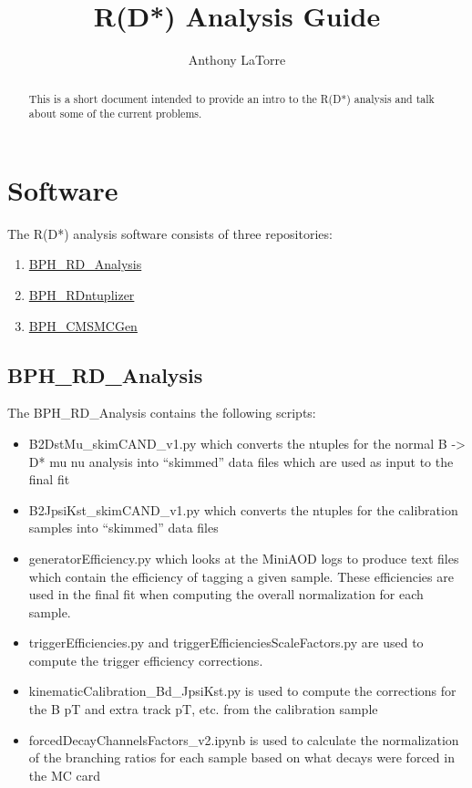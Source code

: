 \documentclass[12pt]{article}
\title{R(D*) Analysis Guide}
\author{Anthony LaTorre}
\begin{document}
\maketitle
\begin{abstract}
This is a short document intended to provide an intro to the R(D*) analysis and talk about some of the current problems.
\end{abstract}
\section{Software}
The R(D*) analysis software consists of three repositories:
\begin{enumerate}
\item \href{https://github.com/alatorre-caltech/BPH\_RD\_Analysis}{BPH\_RD\_Analysis}
\item \href{https://github.com/alatorre-caltech/BPH\_RDntuplizer}{BPH\_RDntuplizer}
\item \href{https://github.com/alatorre-caltech/BPH\_CMSMCGen}{BPH\_CMSMCGen}
\end{enumerate}
\subsection{BPH\_RD\_Analysis}
The BPH\_RD\_Analysis contains the following scripts:
\begin{itemize}
\item B2DstMu\_skimCAND\_v1.py which converts the ntuples for the normal B -> D* mu nu analysis into ``skimmed'' data files which are used as input to the final fit
\item B2JpsiKst\_skimCAND\_v1.py which converts the ntuples for the calibration samples into ``skimmed'' data files
\item generatorEfficiency.py which looks at the MiniAOD logs to produce text files which contain the efficiency of tagging a given sample. These efficiencies are used in the final fit when computing the overall normalization for each sample.
\item triggerEfficiencies.py and triggerEfficienciesScaleFactors.py are used to compute the trigger efficiency corrections.
\item kinematicCalibration\_Bd\_JpsiKst.py is used to compute the corrections for the B pT and extra track pT, etc. from the calibration sample
\item forcedDecayChannelsFactors\_v2.ipynb is used to calculate the normalization of the branching ratios for each sample based on what decays were forced in the MC card
\end{itemize}
\end{document}
